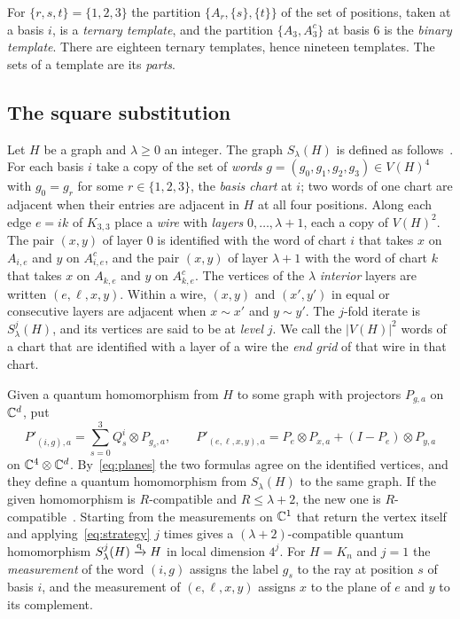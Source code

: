 For $\{r,s,t\}=\{1,2,3\}$ the partition $\{A_r,\{s\},\{t\}\}$ of the set of positions, taken at a basis $i$, is a \emph{ternary template}, and the partition $\{A_3,A_3^c\}$ at basis $6$ is the \emph{binary template}. There are eighteen ternary templates, hence nineteen templates. The sets of a template are its \emph{parts}.

\subsection{The square substitution}\label{sec:substitution}

Let $H$ be a graph and $\lambda\ge0$ an integer. The graph $S_\lambda(H)$ is defined as follows~\cite[Section~2.3]{Z}. For each basis $i$ take a copy of the set of \emph{words} $g=(g_0,g_1,g_2,g_3)\in V(H)^4$ with $g_0=g_r$ for some $r\in\{1,2,3\}$, the \emph{basis chart} at $i$; two words of one chart are adjacent when their entries are adjacent in $H$ at all four positions. Along each edge $e=ik$ of $K_{3,3}$ place a \emph{wire} with \emph{layers} $0,\ldots,\lambda+1$, each a copy of $V(H)^2$. The pair $(x,y)$ of layer $0$ is identified with the word of chart $i$ that takes $x$ on $A_{i,e}$ and $y$ on $A_{i,e}^c$, and the pair $(x,y)$ of layer $\lambda+1$ with the word of chart $k$ that takes $x$ on $A_{k,e}$ and $y$ on $A_{k,e}^c$. The vertices of the $\lambda$ \emph{interior} layers are written $(e,\ell,x,y)$. Within a wire, $(x,y)$ and $(x',y')$ in equal or consecutive layers are adjacent when $x\sim x'$ and $y\sim y'$. The $j$-fold iterate is $S^j_\lambda(H)$, and its vertices are said to be at \emph{level} $j$. We call the $|V(H)|^2$ words of a chart that are identified with a layer of a wire the \emph{end grid} of that wire in that chart.

Given a quantum homomorphism from $H$ to some graph with projectors $P_{g,a}$ on $\mathbb C^d$, put
\begin{equation}\label{eq:strategy}
 P'_{(i,g),a}=\sum_{s=0}^3Q^i_s\otimes P_{g_s,a},\qquad
 P'_{(e,\ell,x,y),a}=P_e\otimes P_{x,a}+(I-P_e)\otimes P_{y,a}
\end{equation}
on $\mathbb C^4\otimes\mathbb C^d$. By~\eqref{eq:planes} the two formulas agree on the identified vertices, and they define a quantum homomorphism from $S_\lambda(H)$ to the same graph. If the given homomorphism is $R$-compatible and $R\le\lambda+2$, the new one is $R$-compatible~\cite[Lemma~2.2]{Z}. Starting from the measurements on $\mathbb C^1$ that return the vertex itself and applying~\eqref{eq:strategy} $j$ times gives a $(\lambda+2)$-compatible quantum homomorphism $S^j_\lambda(H)\xrightarrow{\mathrm q} H$ in local dimension $4^j$. For $H=K_n$ and $j=1$ the \emph{measurement} of the word $(i,g)$ assigns the label $g_s$ to the ray at position $s$ of basis $i$, and the measurement of $(e,\ell,x,y)$ assigns $x$ to the plane of $e$ and $y$ to its complement.

